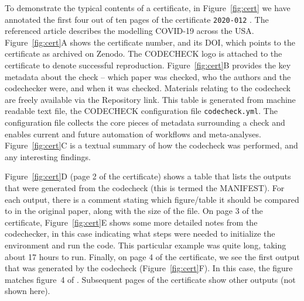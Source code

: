 \documentclass[12pt]{article}
\begin{document}
To demonstrate the typical contents of a certificate, in
Figure~\ref{fig:cert} we have annotated the first four out of ten
pages of the certificate \texttt{2020-012} \cite{cert-2020-012}.
The referenced article \cite{unwin_report_2020} describes the modelling COVID-19
across the USA.
Figure~\ref{fig:cert}A shows the certificate number, and its DOI,
which points to the certificate as archived on Zenodo.
The CODECHECK logo is
attached to the certificate to denote successful reproduction.
Figure~\ref{fig:cert}B provides the key metadata about the check --
which paper was checked, who the authors and the codechecker were,
and when it was checked. Materials
relating to the codecheck are freely available via the Repository
link. This table is generated from machine readable text file, the
CODECHECK configuration file \texttt{codecheck.yml}.
The configuration file collects the core pieces of metadata surrounding
a check and enables current and future automation of workflows and 
meta-analyses.
Figure~\ref{fig:cert}C is a textual summary of how the codecheck was
performed, and any interesting findings.

Figure~\ref{fig:cert}D (page 2 of the certificate) shows a table that
lists the outputs that were generated from the codecheck (this is
termed the MANIFEST).  For each output, there is a comment stating
which figure/table it should be compared to in the original paper,
along with the size of the file.  On page 3 of the certificate,
Figure~\ref{fig:cert}E shows some more detailed notes from the
codechecker, in this case indicating what steps were needed to
initialize the environment and run the code.  This particular example
was quite long, taking about 17 hours to run.  Finally, on page 4 of
the certificate, we see the first output that was generated by the
codecheck (Figure~\ref{fig:cert}F).  In this case, the figure matches
figure~4 of \cite{unwin_report_2020}.
Subsequent pages of the certificate show other outputs (not shown here).
\end{document}
